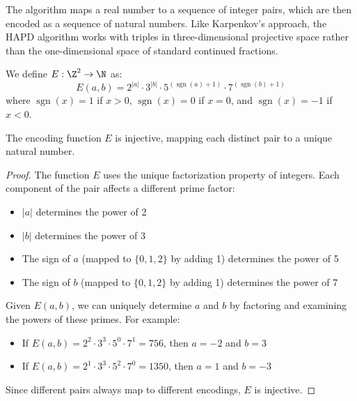 The algorithm maps a real number to a sequence of integer pairs, which are then encoded as a sequence of natural numbers. Like Karpenkov's approach, the HAPD algorithm works with triples in three-dimensional projective space rather than the one-dimensional space of standard continued fractions.

\begin{definition}\label{def:encoding}
We define $E : \Z^2 \to \N$ as:
\begin{equation}
E(a, b) = 2^{|a|} \cdot 3^{|b|} \cdot 5^{(\operatorname{sgn}(a)+1)} \cdot 7^{(\operatorname{sgn}(b)+1)}
\end{equation}
where $\operatorname{sgn}(x) = 1$ if $x > 0$, $\operatorname{sgn}(x) = 0$ if $x = 0$, and $\operatorname{sgn}(x) = -1$ if $x < 0$.
\end{definition}

\begin{lemma}\label{lem:encoding_injective}
The encoding function $E$ is injective, mapping each distinct pair to a unique natural number.
\end{lemma}

\begin{proof}
The function $E$ uses the unique factorization property of integers. Each component of the pair affects a different prime factor:
\begin{itemize}
    \item $|a|$ determines the power of 2
    \item $|b|$ determines the power of 3
    \item The sign of $a$ (mapped to $\{0,1,2\}$ by adding 1) determines the power of 5
    \item The sign of $b$ (mapped to $\{0,1,2\}$ by adding 1) determines the power of 7
\end{itemize}

Given $E(a,b)$, we can uniquely determine $a$ and $b$ by factoring and examining the powers of these primes. For example:
\begin{itemize}
    \item If $E(a,b) = 2^2 \cdot 3^3 \cdot 5^0 \cdot 7^1 = 756$, then $a = -2$ and $b = 3$
    \item If $E(a,b) = 2^1 \cdot 3^3 \cdot 5^2 \cdot 7^0 = 1350$, then $a = 1$ and $b = -3$
\end{itemize}

Since different pairs always map to different encodings, $E$ is injective.
\end{proof}


